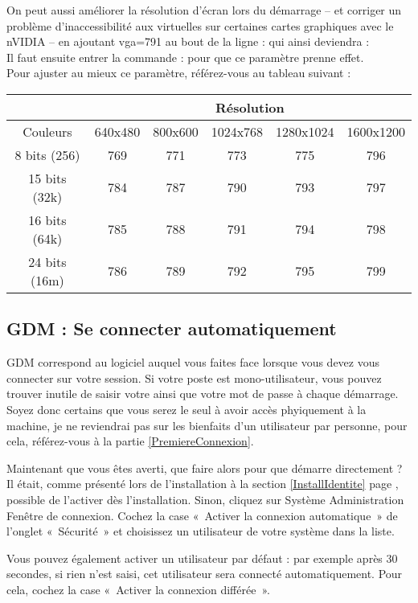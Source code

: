 On peut aussi améliorer la résolution d'écran lors du démarrage -- et corriger un problème d'inaccessibilité aux  virtuelles sur certaines cartes graphiques avec le  nVIDIA -- en ajoutant vga=791 au bout de la ligne :  qui ainsi deviendra :\\
Il faut ensuite entrer la commande :  pour que ce paramètre prenne effet.\\ Pour ajuster au mieux ce paramètre, référez-vous au tableau suivant :\par
\begin{tabular}{||c||c|c|c|c|c||}
\cline{2-6}
\cline{2-6}
\multicolumn{1}{c||}{} & \multicolumn{5}{c|}{Résolution}\\
\hline
\hline
Couleurs & 640x480 & 800x600 & 1024x768 & 1280x1024 & 1600x1200\\
\hline
\hline
8 bits (256) & 769 & 771 & 773 & 775 &796\\
\hline
15 bits (32k) & 784 & 787 & 790 & 793 & 797\\
\hline
16 bits (64k) & 785 & 788 & 791 & 794 & 798\\
\hline
24 bits (16m) & 786 & 789 & 792 & 795 & 799\\
\hline
\hline
\end{tabular}
\subsection{GDM : Se connecter automatiquement}
\label{RefConnexionAuto}
GDM correspond au logiciel auquel vous faites face lorsque vous devez vous connecter sur votre session. Si votre poste est mono-utilisateur, vous pouvez trouver inutile de saisir votre  ainsi que votre mot de passe à chaque démarrage. Soyez donc certains que vous serez le seul à avoir accès phyiquement à la machine, je ne reviendrai pas sur les bienfaits d'un utilisateur par personne, pour cela, référez-vous à la partie \ref{PremiereConnexion}.\par
Maintenant que vous êtes averti, que faire alors pour que  démarre directement ?\\
Il était, comme présenté lors de l'installation à la section \ref{InstallIdentite} page \pageref{InstallIdentite}, possible de l'activer dès l'installation. Sinon, cliquez sur Système \FlecheDroite Administration \FlecheDroite Fenêtre de connexion. Cochez la case «~Activer la connexion automatique~» de l'onglet «~Sécurité~» et choisissez un utilisateur de votre système dans la liste.\par
Vous pouvez également activer un utilisateur par défaut : par exemple après 30 secondes, si rien n'est saisi, cet utilisateur sera connecté automatiquement. Pour cela, cochez la case «~Activer la connexion différée~».

